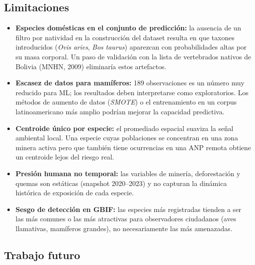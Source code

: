 \documentclass[12pt,a4paper]{article}
\begin{document}
\subsection{Limitaciones}

\begin{itemize}
  \item \textbf{Especies domésticas en el conjunto de predicción:}
        la ausencia de un filtro por natividad en la construcción del dataset resulta
        en que taxones introducidos (\textit{Ovis aries}, \textit{Bos taurus}) aparezcan
        con probabilidades altas por su masa corporal.
        Un paso de validación con la lista de vertebrados nativos de Bolivia
        (MNHN, 2009) eliminaría estos artefactos.
  \item \textbf{Escasez de datos para mamíferos:} 189 observaciones es un número muy
        reducido para ML; los resultados deben interpretarse como exploratorios.
        Los métodos de aumento de datos (\textit{SMOTE}) o el entrenamiento en un
        corpus latinoamericano más amplio podrían mejorar la capacidad predictiva.
  \item \textbf{Centroide único por especie:} el promediado espacial suaviza la señal
        ambiental local.  Una especie cuyas poblaciones se concentran en una zona
        minera activa pero que también tiene ocurrencias en una ANP remota obtiene
        un centroide lejos del riesgo real.
  \item \textbf{Presión humana no temporal:} las variables de minería, deforestación y
        quemas son estáticas (snapshot 2020--2023) y no capturan la dinámica histórica
        de exposición de cada especie.
  \item \textbf{Sesgo de detección en GBIF:} las especies más registradas tienden a
        ser las más comunes o las más atractivas para observadores ciudadanos (aves
        llamativas, mamíferos grandes), no necesariamente las más amenazadas.
\end{itemize}

\subsection{Trabajo futuro}
\end{document}
